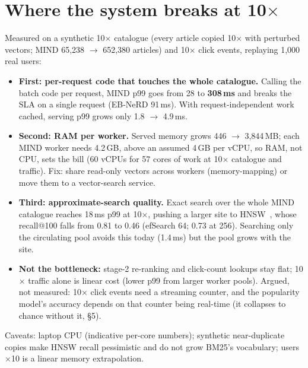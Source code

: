 \documentclass[10pt]{article}
\newenvironment{tightitem}{\begin{itemize}\setlength{\itemsep}{1pt}\setlength{\parskip}{0pt}\setlength{\topsep}{2pt}}{\end{itemize}}
\begin{document}
\section{Where the system breaks at 10\texorpdfstring{$\times$}{x}}
Measured on a synthetic 10$\times$ catalogue (every article copied 10$\times$ with perturbed vectors; MIND
65,238 $\to$ 652,380 articles) and 10$\times$ click events, replaying 1,000 real users:
\begin{tightitem}
\item \textbf{First: per-request code that touches the whole catalogue.} Calling the batch code per request, MIND p99
goes from 28 to \textbf{308\,ms} and breaks the SLA on a
single request (EB-NeRD 91\,ms). With request-independent work cached,
serving p99 grows only 1.8 $\to$ 4.9\,ms.
\item \textbf{Second: RAM per worker.} Served memory grows 446 $\to$
3,844\,MB; each MIND worker needs 4.2\,GB, above an assumed
4\,GB per vCPU, so RAM, not CPU, sets the bill (60 vCPUs for
57 cores of work at 10$\times$ catalogue and traffic). Fix: share read-only vectors across workers
(memory-mapping) or move them to a vector-search service.
\item \textbf{Third: approximate-search quality.} Exact search over the whole MIND catalogue reaches
18\,ms p99 at 10$\times$, pushing a larger site to HNSW~\cite{hnsw,faiss}, whose
recall@100 falls from 0.81 to 0.46 (efSearch 64; 0.73 at 256). Searching only the
circulating pool avoids this today (1.4\,ms) but the pool grows with the site.
\item \textbf{Not the bottleneck:} stage-2 re-ranking and click-count lookups stay flat; 10$\times$ traffic alone is linear
cost (lower p99 from larger worker pools). Argued, not measured: 10$\times$ click events need a streaming counter, and
the popularity model's accuracy depends on that counter being real-time (it collapses to chance without it, \S5).
\end{tightitem}
Caveats: laptop CPU (indicative per-core numbers); synthetic near-duplicate copies make HNSW recall pessimistic and do
not grow BM25's vocabulary; users $\times$10 is a linear memory extrapolation.
\end{document}
